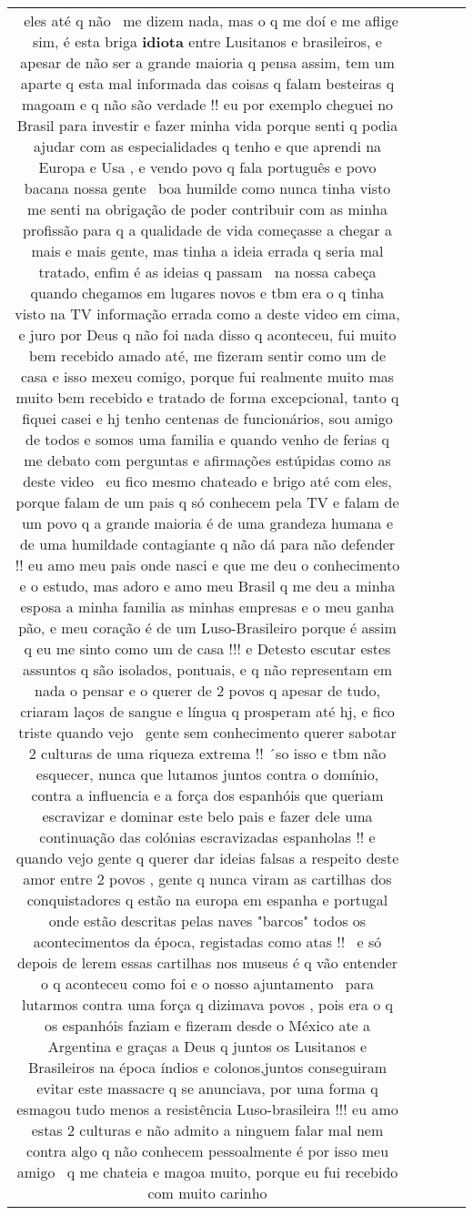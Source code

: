 \documentclass[11pt]{article}
\newlength\mylength
\begin{document}
\begin{center}
\begin{longtable}{|C{.65\mylength}|C{.30\mylength}|C{.12\mylength}|C{.12\mylength}|C{.12\mylength}|}
  \small {} eles até q não  me dizem nada, mas o q me doí e me aflige sim, é esta briga \textbf{idiota} entre Lusitanos e brasileiros, e apesar de não ser a grande maioria q pensa assim, tem um aparte q esta mal informada das coisas q falam besteiras q magoam e q não são verdade !! eu por exemplo cheguei no Brasil para investir e fazer minha vida porque senti q podia ajudar com as especialidades q tenho e que aprendi na Europa e Usa , e vendo povo q fala português e povo bacana nossa gente  boa humilde como nunca tinha visto me senti na obrigação de poder contribuir com as minha profissão para q a qualidade de vida começasse a chegar a mais e mais gente, mas tinha a ideia errada q seria mal tratado, enfim é as ideias q passam  na nossa cabeça quando chegamos em lugares novos e tbm era o q tinha visto na TV informação errada como a deste video em cima, e juro por Deus q não foi nada disso q aconteceu, fui muito bem recebido amado até, me fizeram sentir como um de casa e isso mexeu comigo, porque fui realmente muito mas muito bem recebido e tratado de forma excepcional, tanto q fiquei casei e hj tenho centenas de funcionários, sou amigo de todos e somos uma familia e quando venho de ferias q me debato com perguntas e afirmações estúpidas como as deste video  eu fico mesmo chateado e brigo até com eles, porque falam de um pais q só conhecem pela TV e falam de um povo q a grande maioria é de uma grandeza humana e de uma humildade contagiante q não dá para não defender !! eu amo meu pais onde nasci e que me deu o conhecimento e o estudo, mas adoro e amo meu Brasil q me deu a minha esposa a minha familia as minhas empresas e o meu ganha pão, e meu coração é de um Luso-Brasileiro porque é assim q eu me sinto como um de casa !!! e Detesto escutar estes assuntos q são isolados, pontuais, e q não representam em nada o pensar e o querer de 2 povos q apesar de tudo, criaram laços de sangue e língua q prosperam até hj, e fico triste quando vejo  gente sem conhecimento querer sabotar 2 culturas de uma riqueza extrema !! ´so isso e tbm não esquecer, nunca que lutamos juntos contra o domínio, contra a influencia e a força dos espanhóis que queriam escravizar e dominar este belo pais e fazer dele uma continuação das colónias escravizadas espanholas !! e quando vejo gente q querer dar ideias falsas a respeito deste amor entre 2 povos , gente q nunca viram as cartilhas dos conquistadores q estão na europa em espanha e portugal onde estão descritas pelas naves "barcos" todos os acontecimentos da época, registadas como atas !!  e só depois de lerem essas cartilhas nos museus é q vão entender o q aconteceu como foi e o nosso ajuntamento  para lutarmos contra uma força q dizimava povos , pois era o q os espanhóis faziam e fizeram desde o México ate a Argentina e graças a Deus q juntos os Lusitanos e Brasileiros na época índios e colonos,juntos conseguiram evitar este massacre q se anunciava, por uma forma q esmagou tudo menos a resistência Luso-brasileira !!! eu amo estas 2 culturas e não admito a ninguem falar mal nem contra algo q não conhecem pessoalmente é por isso meu amigo  q me chateia e magoa muito, porque eu fui recebido com muito carinho 
\end{longtable}
\end{center}
\end{document}
